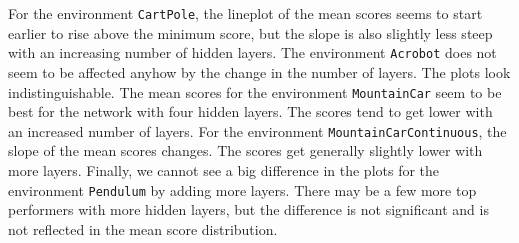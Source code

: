 For the environment \verb|CartPole|, the lineplot of the mean scores seems to start earlier to rise above the minimum score, but the slope is also slightly less steep with an increasing number of hidden layers. The environment \verb|Acrobot| does not seem to be affected anyhow by the change in the number of layers. The plots look indistinguishable. The mean scores for the environment \verb|MountainCar| seem to be best for the network with four hidden layers. The scores tend to get lower with an increased number of layers. For the environment \verb|MountainCarContinuous|, the slope of the mean scores changes. The scores get generally slightly lower with more layers. Finally, we cannot see a big difference in the plots for the environment \verb|Pendulum| by adding more layers. There may be a few more top performers with more hidden layers, but the difference is not significant and is not reflected in the mean score distribution.

